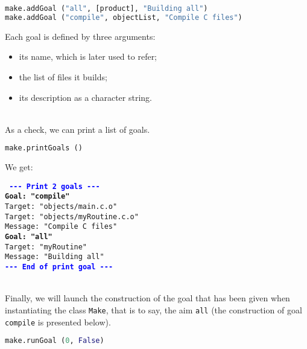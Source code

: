 \documentclass[a4paper,11pt]{extarticle}
\begin{document}
\begin{lstlisting}[language=py]
make.addGoal ("all", [product], "Building all")
make.addGoal ("compile", objectList, "Compile C files")
\end{lstlisting}
Each goal is defined by three arguments:
\begin{itemize}
\item its name, which is later used to refer;
\item the list of files it builds;
\item its description as a character string.
\end{itemize}

~\\As a check, we can print a list of goals.
\begin{lstlisting}[language=py]
make.printGoals ()
\end{lstlisting}

We get:

\begin{mdframed}[hidealllines=true,backgroundcolor=lightgray!20]
\tt\footnotesize
\textcolor{blue}{\bf{-}{-}{-} Print 2 goals {-}{-}{-}}\\
\textcolor{OliveGreen}{\bf Goal: "compile"}\\
\hspace*{1.2em}Target: "objects/main.c.o"\\
\hspace*{1.2em}Target: "objects/myRoutine.c.o"\\
\hspace*{1.2em}Message: "Compile C files"\\
\textcolor{OliveGreen}{\bf Goal: "all"}\\
\hspace*{1.2em}Target: "myRoutine"\\
\hspace*{1.2em}Message: "Building all"\\
\textcolor{blue}{\bf{-}{-}{-} End of print goal {-}{-}{-}}
\end{mdframed}

~\\Finally, we will launch the construction of the goal that has been given when instantiating the class \texttt{Make}, that is to say, the aim \texttt{all} (the construction of goal \texttt{compile} is presented below).

\begin{lstlisting}[language=py]
make.runGoal (0, False)
\end{lstlisting}
\end{document}
